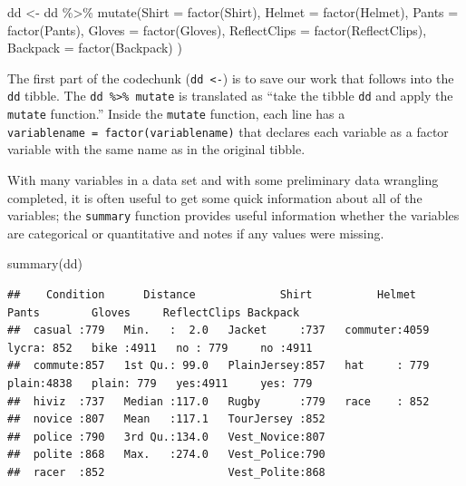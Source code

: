 \documentclass[
]{book}
\newenvironment{Shaded}{\begin{snugshade}}{\end{snugshade}}
\newcommand{\AttributeTok}[1]{\textcolor[rgb]{0.77,0.63,0.00}{#1}}
\newcommand{\FunctionTok}[1]{\textcolor[rgb]{0.00,0.00,0.00}{#1}}
\newcommand{\NormalTok}[1]{#1}
\newcommand{\OtherTok}[1]{\textcolor[rgb]{0.56,0.35,0.01}{#1}}
\newcommand{\SpecialCharTok}[1]{\textcolor[rgb]{0.00,0.00,0.00}{#1}}
\begin{document}
\newpage

\begin{Shaded}
\begin{Highlighting}[]
\NormalTok{dd }\OtherTok{\textless{}{-}}\NormalTok{ dd }\SpecialCharTok{\%\textgreater{}\%} \FunctionTok{mutate}\NormalTok{(}\AttributeTok{Shirt =} \FunctionTok{factor}\NormalTok{(Shirt),}
                    \AttributeTok{Helmet =} \FunctionTok{factor}\NormalTok{(Helmet),}
                    \AttributeTok{Pants =} \FunctionTok{factor}\NormalTok{(Pants),}
                    \AttributeTok{Gloves =} \FunctionTok{factor}\NormalTok{(Gloves),}
                    \AttributeTok{ReflectClips =} \FunctionTok{factor}\NormalTok{(ReflectClips),}
                    \AttributeTok{Backpack =} \FunctionTok{factor}\NormalTok{(Backpack)}
\NormalTok{                    )}
\end{Highlighting}
\end{Shaded}

The first part of the codechunk (\texttt{dd\ \textless{}-}) is to save our work that follows into the \texttt{dd} tibble. The \texttt{dd\ \%\textgreater{}\%\ mutate} is translated as ``take the tibble \texttt{dd} and apply the \texttt{mutate} function.'' Inside the \texttt{mutate} function, each line has a \texttt{variablename\ =\ factor(variablename)} that declares each variable as a factor variable with the same name as in the original tibble.

\indent With many variables in a data set and with some preliminary data wrangling completed, it is often useful to get some
quick information about all of the variables; the \texttt{summary} function provides
useful information whether the variables are categorical or
quantitative and notes if any values were missing. 

\footnotesize

\begin{Shaded}
\begin{Highlighting}[]
\FunctionTok{summary}\NormalTok{(dd)}
\end{Highlighting}
\end{Shaded}

\begin{verbatim}
##    Condition      Distance             Shirt          Helmet       Pants        Gloves     ReflectClips Backpack  
##  casual :779   Min.   :  2.0   Jacket     :737   commuter:4059   lycra: 852   bike :4911   no : 779     no :4911  
##  commute:857   1st Qu.: 99.0   PlainJersey:857   hat     : 779   plain:4838   plain: 779   yes:4911     yes: 779  
##  hiviz  :737   Median :117.0   Rugby      :779   race    : 852                                                    
##  novice :807   Mean   :117.1   TourJersey :852                                                                    
##  police :790   3rd Qu.:134.0   Vest_Novice:807                                                                    
##  polite :868   Max.   :274.0   Vest_Police:790                                                                    
##  racer  :852                   Vest_Polite:868
\end{verbatim}
\end{document}
